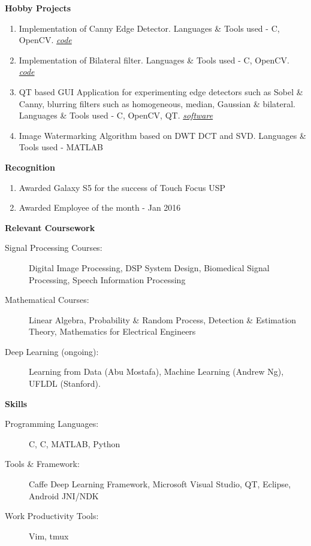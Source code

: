 \documentclass[letterpaper,11pt]{article}
\def\CC{{C\nolinebreak[4]\hspace{-.05em}\raisebox{.4ex}{\tiny\bf ++}}}
\newcommand{\resheading}[1]{{\large \colorbox{mygrey}{\begin{minipage}{\textwidth}{\textbf{#1 \vphantom{p\^{E}}}}\end{minipage}}}}
\begin{document}
\resheading{Hobby Projects}
\begin{enumerate}
	\item Implementation of Canny Edge Detector. Languages \& Tools used - \CC, OpenCV.
		\faGithub \hspace{1mm}\href{https://github.com/nrupatunga/Canny-Edge-Detector}{\emph{code}}
	\item Implementation of Bilateral filter. Languages \& Tools used - \CC, OpenCV.
		\faGithub \hspace{1mm}\href{https://github.com/nrupatunga/Bilateral-Filter}{\emph{code}}
	\item QT based GUI Application for experimenting edge detectors such as Sobel \& Canny, blurring filters such as homogeneous, median, Gaussian \& bilateral. 
		Languages \& Tools used - \CC, OpenCV, QT. 
		\faWindows \hspace{1mm}\href{https://github.com/nrupatunga/Computer-Vision-Tool}{\emph{software}}
	\item Image Watermarking Algorithm based on DWT DCT and SVD.  Languages \& Tools used - MATLAB
\end{enumerate}

\resheading{Recognition}
\begin{enumerate}
	\item Awarded Galaxy S5 for the success of Touch Focus USP
	\item Awarded Employee of the month - Jan 2016
\end{enumerate}

\resheading{Relevant Coursework}
\begin{description}
	\item[Signal Processing Courses:]
		Digital Image Processing, DSP System Design, Biomedical Signal Processing, Speech Information Processing
	\item[Mathematical Courses:]
		Linear Algebra, Probability \& Random Process, Detection \& Estimation Theory, Mathematics for Electrical Engineers
	\item[Deep Learning (ongoing):]
		Learning from Data (Abu Mostafa), Machine Learning (Andrew Ng), UFLDL (Stanford).
\end{description}

\resheading{Skills}
\begin{description}
	\item[Programming Languages:]
		C, \CC, MATLAB, Python
	\item[Tools \& Framework:]
		Caffe Deep Learning Framework, Microsoft Visual Studio, QT, Eclipse, Android JNI/NDK
	\item[Work Productivity Tools:] Vim, tmux
\end{description}
\end{document}
